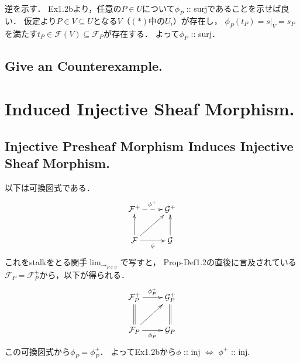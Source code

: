 \documentclass[a4paper]{jsarticle}
\newcommand{\shF}{\mathcal{F}}
\newcommand{\shG}{\mathcal{G}}
\begin{document}
    逆を示す．
    Ex1.2bより，任意の$P \in U$について$\phi_P$ :: surjであることを示せば良い．
    仮定より$P \in V \subseteq U$となる$V$（$(*)$中の$U_i$）が存在し，
    $\phi_P(t_P)=s|_V=s_P$を満たす$t_P \in \shF(V) \subseteq \shF_P$が存在する．
    よって$\phi_P$ :: surj．

    \subsection{Give an Counterexample.}



\section{Induced Injective Sheaf Morphism.} %
    \subsection{Injective Presheaf Morphism Induces Injective Sheaf Morphism.}
    以下は可換図式である．
    \[
    \xymatrix
    {
        \shF^+ \ar@{-->}[r]^{\phi^+} & \shG^+ \\
        \shF \ar[u] \ar[r]_-{\phi} \ar[ur]& \shG \ar[u]
    }
    \]
    これをstalkをとる関手$\lim_{\to_{P \in U}}$で写すと，
    Prop-Def1.2の直後に言及されている$\shF_P=\shF_P^+$から，以下が得られる．
    \[
    \xymatrix
    {
        \shF_P^+ \ar[r]^{\phi_P^+} & \shG_P^+ \\
        \shF_P \ar@{=}[u] \ar[r]_-{\phi_P} \ar[ur]& \shG_P \ar@{=}[u]
    }
    \]
    この可換図式から$\phi_P=\phi_P^+$．
    よってEx1.2bから$\phi$ :: inj $\iff$ $\phi^+$ :: inj.
\end{document}
